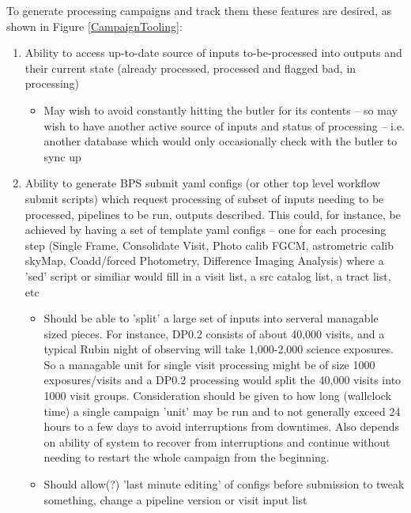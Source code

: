 \documentclass[DM,authoryear,toc]{lsstdoc}
\begin{document}
To generate processing campaigns and track them these features are desired,
as shown in Figure \ref{CampaignTooling}:

	\begin{enumerate}

	\item Ability to access up-to-date source of inputs to-be-processed
		into outputs and their current state 
		(already processed, processed and flagged bad, 
		in processing)

	\begin{itemize}
	
	\item May wish to avoid constantly hitting the butler for
	its contents -- so may wish to have another active source
	of inputs and status of processing -- i.e. another database
	which would only occasionally check with the butler to sync up


	\end{itemize}

	\item Ability to generate BPS submit yaml configs 
	(or other top level workflow submit scripts) which request processing
	of subset of inputs needing to be processed, pipelines to be run,
	outputs described.  This could, for instance, be achieved by having
	a set of template yaml configs -- one for each procesing step
	(Single Frame, Consolidate Visit, Photo calib FGCM, 
	astrometric calib skyMap, Coadd/forced Photometry, Difference
	Imaging Analysis) where a 'sed' script or similiar would fill in
	a visit list, a src catalog list, a tract list, etc

	\begin{itemize}

	\item Should be able to 'split' a large set of inputs into
	serveral managable sized pieces.  For instance, DP0.2 consists of
	about 40,000 visits, and a typical Rubin night of observing will
	take 1,000-2,000 science exposures.   So a managable unit for
	single visit processing might be of size 1000 exposures/visits and
	a DP0.2 processing would split the 40,000 visits into 1000 visit
	groups.  Consideration should be given to how long (wallclock time)
	a single campaign 'unit' may be run and to not generally exceed 
	24 hours to a few days to avoid interruptions from downtimes.
	Also depends on ability of system to recover from interruptions and
	continue without needing to restart the whole campaign from
	the beginning.
	

	\item  Should allow(?) 'last minute editing' of configs before
	submission to tweak something, change a pipeline version or
	visit input list


\end{itemize}
\end{enumerate}
\end{document}
